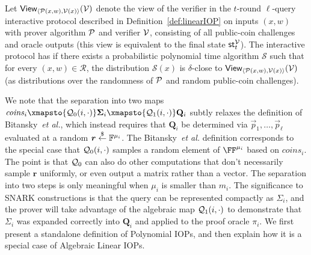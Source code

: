 \begin{definition}
Let $\textsf{View}_{\langle \mathcal{P}(x, w), \mathcal{V}(x) \rangle}(\mathcal{V})$ denote the view of the verifier in the $t$-round $\ell$-query interactive protocol described in Definition~\ref{def:linearIOP} on inputs $(x,w)$ with prover algorithm $\mathcal{P}$ and verifier $\mathcal{V}$, consisting of all public-coin challenges and oracle outputs (this view is equivalent to the final state $\textsf{st}^\mathcal{V}_t$). The interactive protocol has  if there exists a probabilistic polynomial time algorithm $\mathcal{S}$ such that for every $(x, w) \in \mathcal{R}$, the distribution $\mathcal{S}(x)$ is $\delta$-close to $\textsf{View}_{\langle \mathcal{P}(x, w), \mathcal{V}(x) \rangle}(\mathcal{V})$ (as distributions over the randomness of $\mathcal{P}$ and random public-coin challenges).
\end{definition}

We note that the separation into two maps $\mathit{coins}_i \xmapsto{\qgen_0(i, \cdot)} \boldsymbol{\Sigma}_i \xmapsto{\qgen_1(i, \cdot)} \mathbf{Q}_i$ subtly relaxes the definition of Bitansky~\emph{et al.}, which instead requires that $\mathbf{Q}_i$ be determined via $\vec{p}_1, \ldots, \vec{p}_\ell$ evaluated at a random $\boldsymbol{r} \overset{\$}{\gets} \mathbb{F}^{\mu_i}$. The Bitansky~\emph{et al.} definition corresponds to the special case that $\mathcal{Q}_0(i, \cdot)$ samples a random element of $\FF^{\mu_i}$ based on $\textit{coins}_i$. The point is that $\mathcal{Q}_0$ can also do other computations that don't necessarily sample $\boldsymbol{r}$ uniformly, or even output a matrix rather than a vector. The separation into two steps is only meaningful when $\mu_i$ is smaller than $m_i$. The significance to SNARK constructions is that the query can be represented compactly as $\Sigma_i$, and the prover will take advantage of the algebraic map $\mathcal{Q}_1(i, \cdot)$ to demonstrate that $\Sigma_i$ was expanded correctly into $\mathbf{Q}_i$ and applied to the proof oracle $\pi_i$. 
 We first present a standalone definition of Polynomial IOPs, and then explain how it is a special case of Algebraic Linear IOPs. 
 
